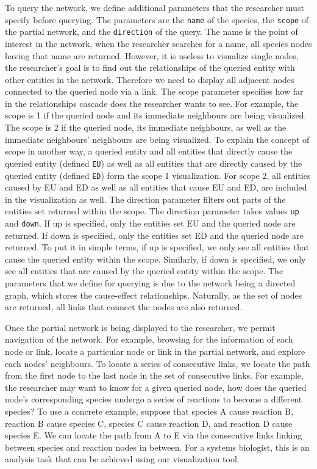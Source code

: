 \documentclass[journal]{vgtc}                %
\begin{document}
To query the network, we define additional parameters that the researcher must specify before querying. The parameters are the \texttt{name} of the species, the \texttt{scope} of the partial network, and the \texttt{direction} of the query. The name is the point of interest in the network, when the researcher searches for a name, all species nodes having that name are returned. However, it is useless to visualize single nodes, the researcher’s goal is to find out the relationships of the queried entity with other entities in the network. Therefore we need to display all adjacent nodes connected to the queried node via a link. The scope parameter specifies how far in the relationships cascade does the researcher wants to see. For example, the scope is 1 if the queried node and its immediate neighbours are being visualized. The scope is 2 if the queried node, its immediate neighbours, as well as the immediate neighbours’ neighbours are being visualized. To explain the concept of scope in another way, a queried entity and all entities that directly cause the queried entity (defined \texttt{EU}) as well as all entities that are directly caused by the queried entity (defined \texttt{ED}) form the scope 1 visualization. For scope 2, all entities caused by EU and ED as well as all entities that cause EU and ED, are included in the visualization as well. The direction parameter filters out parts of the entities set returned within the scope. The direction parameter takes values \texttt{up} and \texttt{down}. If up is specified, only the entities set EU and the queried node are returned. If down is specified, only the entities set ED and the queried node are returned. To put it in simple terms, if up is specified, we only see all entities that cause the queried entity within the scope. Similarly, if down is specified, we only see all entities that are caused by the queried entity within the scope. The parameters that we define for querying is due to the network being a directed graph, which stores the cause-effect relationships. Naturally, as the set of nodes are returned, all links that connect the nodes are also returned. 

Once the partial network is being displayed to the researcher, we permit navigation of the network. For example, browsing for the information of each node or link, locate a particular node or link in the partial network, and explore each nodes’ neighbours. To locate a series of consecutive links, we locate the path from the first node to the last node in the set of consecutive links. For example, the researcher may want to know for a given queried node, how does the queried node's corresponding species undergo a series of reactions to become a different species? To use a concrete example, suppose that species A cause reaction B, reaction B cause species C, species C cause reaction D, and reaction D cause species E. We can locate the path from A to E via the consecutive links linking between species and reaction nodes in between. For a systems biologist, this is an analysis task that can be achieved using our visualization tool.
\end{document}
